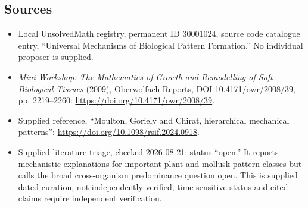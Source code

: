 \documentclass[11pt]{article}
\begin{document}
\subsection{Sources}
\begin{itemize}
\item Local UnsolvedMath registry, permanent ID \(30001024\), source code catalogue entry, ``Universal Mechanisms of Biological Pattern Formation.'' No individual proposer is supplied.
\item \emph{Mini-Workshop: The Mathematics of Growth and Remodelling of Soft Biological Tissues} (2009), Oberwolfach Reports, DOI 10.4171/owr/2008/39, pp. 2219--2260: \url{https://doi.org/10.4171/owr/2008/39}.
\item Supplied reference, ``Moulton, Goriely and Chirat, hierarchical mechanical patterns'': \url{https://doi.org/10.1098/rsif.2024.0918}.
\item Supplied literature triage, checked 2026-08-21: status ``open.'' It reports mechanistic explanations for important plant and mollusk pattern classes but calls the broad cross-organism predominance question open. This is supplied dated curation, not independently verified; time-sensitive status and cited claims require independent verification.
\end{itemize}
\end{document}
